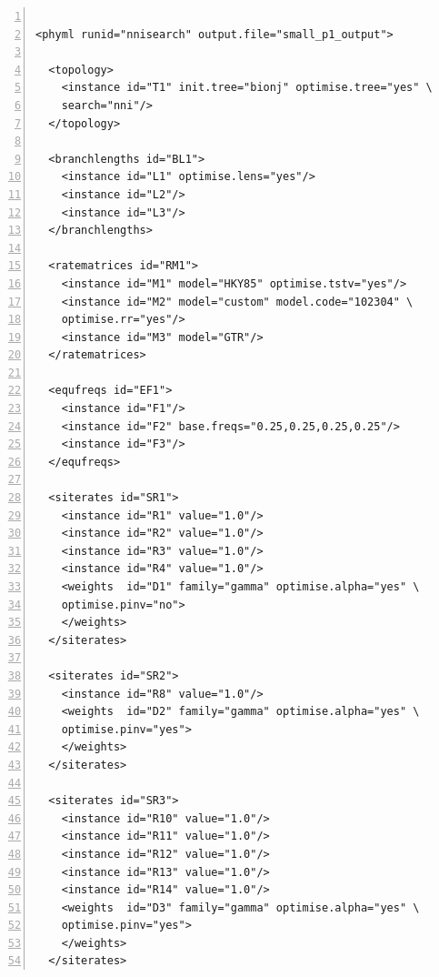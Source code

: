 \documentclass[a4paper,12pt]{article}
\begin{document}
\vspace{0.2cm}
\begin{Verbatim}[frame=single, label=Example of PhyML XML file, samepage=true, baselinestretch=0.5,
  fontsize=\small, numbers=left]

<phyml runid="nnisearch" output.file="small_p1_output">

  <topology>
    <instance id="T1" init.tree="bionj" optimise.tree="yes" \
    search="nni"/>
  </topology>

  <branchlengths id="BL1">
    <instance id="L1" optimise.lens="yes"/>
    <instance id="L2"/>
    <instance id="L3"/>
  </branchlengths>

  <ratematrices id="RM1">
    <instance id="M1" model="HKY85" optimise.tstv="yes"/>
    <instance id="M2" model="custom" model.code="102304" \
    optimise.rr="yes"/>
    <instance id="M3" model="GTR"/>
  </ratematrices>

  <equfreqs id="EF1">
    <instance id="F1"/>
    <instance id="F2" base.freqs="0.25,0.25,0.25,0.25"/>
    <instance id="F3"/>
  </equfreqs>

  <siterates id="SR1">
    <instance id="R1" value="1.0"/>
    <instance id="R2" value="1.0"/>
    <instance id="R3" value="1.0"/>
    <instance id="R4" value="1.0"/>
    <weights  id="D1" family="gamma" optimise.alpha="yes" \
    optimise.pinv="no">
    </weights>
  </siterates>

  <siterates id="SR2">
    <instance id="R8" value="1.0"/>
    <weights  id="D2" family="gamma" optimise.alpha="yes" \
    optimise.pinv="yes">
    </weights>
  </siterates>

  <siterates id="SR3">
    <instance id="R10" value="1.0"/>
    <instance id="R11" value="1.0"/>
    <instance id="R12" value="1.0"/>
    <instance id="R13" value="1.0"/>
    <instance id="R14" value="1.0"/>
    <weights  id="D3" family="gamma" optimise.alpha="yes" \
    optimise.pinv="yes">
    </weights>
  </siterates>

\end{Verbatim}
\end{document}
